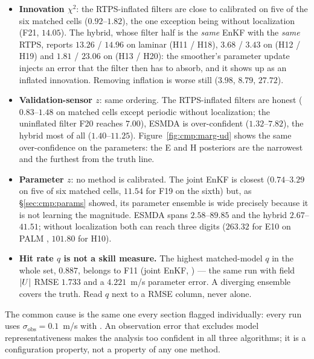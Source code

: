 \begin{itemize}[nosep]
  \item \textbf{Innovation $\chi^2$}: the RTPS-inflated filters are close to
        calibrated on five of the six matched cells ($0.92$--$1.82$), the one
        exception being  without localization (F21, $14.05$).
        The hybrid, whose filter half is the \emph{same} EnKF with the
        \emph{same} RTPS, reports $13.26$ / $14.96$ on laminar (H11 / H18),
        $3.68$ / $3.43$ on  (H12 / H19) and $1.81$ / $23.06$
        on  (H13 / H20): the
        smoother's parameter update injects an error that the filter then has
        to absorb, and it shows up as an inflated innovation. Removing
        inflation is worse still ($3.98$, $8.79$, $27.72$).
  \item \textbf{Validation-sensor $z$}: same ordering. The RTPS-inflated filters are
        honest ($0.83$--$1.48$ on matched cells except periodic without
        localization; the uninflated filter F20 reaches $7.00$), ESMDA
        is over-confident ($1.32$--$7.82$), the hybrid most of all
        ($1.40$--$11.25$). Figure~\ref{fig:cmp:marg-ud} shows the same
        over-confidence on the parameters: the E and H posteriors are the
        narrowest and the furthest from the truth line.
  \item \textbf{Parameter $z$}: no method is calibrated. The joint EnKF is
        closest ($0.74$--$3.29$ on five of six matched cells, $11.54$ for F19
        on the sixth) but, as
        \S\ref{sec:cmp:params} showed, its parameter ensemble is wide precisely
        because it is not learning the magnitude. ESMDA spans
        $2.58$--$89.85$ and the hybrid $2.67$--$41.51$; without localization
        both can reach three digits ($263.32$ for E10 on PALM
        , $101.80$ for H10).
  \item \textbf{Hit rate $q$ is not a skill measure.} The highest matched-model
        $q$ in the whole set, $0.887$, belongs to F11 (joint EnKF,
        ) --- the same run with field $|U|$ RMSE $1.733$ and a
        $4.221$~m/s parameter error. A diverging ensemble covers the truth.
        Read $q$ next to a RMSE column, never alone.
\end{itemize}

The common cause is the same one every section flagged individually: every run
uses $\sigma_{\mathrm{obs}} = 0.1$~m/s with
. An observation error that
excludes model representativeness makes the analysis too confident in all
three algorithms; it is a configuration property, not a property of any one
method.


